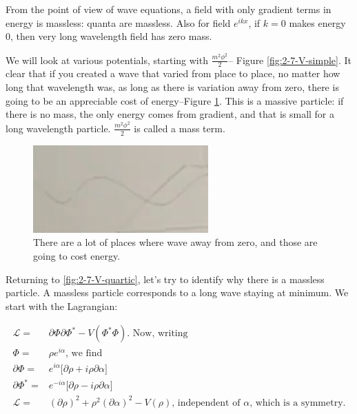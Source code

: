 \documentclass[]{article}
\begin{document}
 From the point of view of wave equations, a field with only gradient terms in energy is massless: quanta are massless. Also for field $e^{ikx}$, if $k=0$ makes energy $0$, then very long wavelength field has zero mass.
 


We will look at various potentials, starting with $\frac{m^2 \phi^2}{2}$--  Figure \ref{fig:2-7-V-simple}. It clear that if you created a wave that varied from place to place, no matter how long that wavelength was, as long as there is  variation away from zero, there is going to be an appreciable cost of energy--Figure \ref{fig:2-7-variation-from-zero}. This is a massive particle: if there is no mass, the only energy comes from gradient, and that is small for a long wavelength particle. $\frac{m^2 \phi^2}{2}$ is called a mass term.

\begin{figure}[H]
	\begin{center}
		\caption{There are a lot of places where wave away from zero, and those are going to cost energy.}\label{fig:2-7-variation-from-zero}
		\includegraphics[width=0.6\textwidth]{2-7-variation-from-zero}
	\end{center}
\end{figure}

Returning to \ref{fig:2-7-V-quartic}, let's try to identify why there is a massless particle. A massless particle corresponds to a long wave staying at minimum. We start with the Lagrangian:

\begin{align*}
	\mathcal{L} =& \partial \Phi \partial \Phi^* - V(\Phi^*\Phi) \text{. Now, writing}\\
	\Phi =& \rho e^{i \alpha} \text{, we find} \\
	\partial \Phi =& e^{i \alpha} \big[\partial \rho + i \rho \partial \alpha\big]\\
	\partial \Phi^* =& e^{-i \alpha} \big[\partial \rho - i \rho \partial \alpha\big]\\
	\mathcal{L} =& (\partial \rho)^2 + \rho^2  (\partial \alpha)^2 - V(\rho) \text{, independent of $\alpha$, which is a symmetry.} 
\end{align*}
\end{document}
